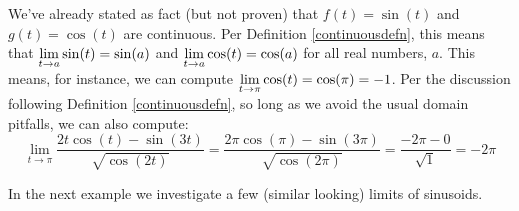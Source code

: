 We've already stated as fact (but not proven) that $f(t) = \sin(t)$ and $g(t) = \cos(t)$ are continuous.  Per Definition \ref{continuousdefn}, this means that $\displaystyle{\lim_{t \rightarrow a} \sin(t) = \sin(a)}$ and $\displaystyle{\lim_{t \rightarrow a} \cos(t) = \cos(a)}$ for all real numbers, $a$.  This means, for instance, we can compute  $\displaystyle{\lim_{t \rightarrow \pi} \cos(t) = \cos(\pi) = -1}$.  Per the discussion following Definition \ref{continuousdefn}, so long as we avoid the usual domain pitfalls, we can also compute:
 \[ \lim_{t \rightarrow \pi} \frac{2t \cos(t) - \sin(3t)}{\sqrt{\cos(2t)}} = \frac{2 \pi \cos(\pi) - \sin(3\pi)}{\sqrt{\cos(2\pi)}} = \frac{-2\pi - 0}{\sqrt{1}} = - 2\pi \]
 
 In the next example we investigate a few (similar looking) limits of sinusoids.
 
 \pagebreak
 
